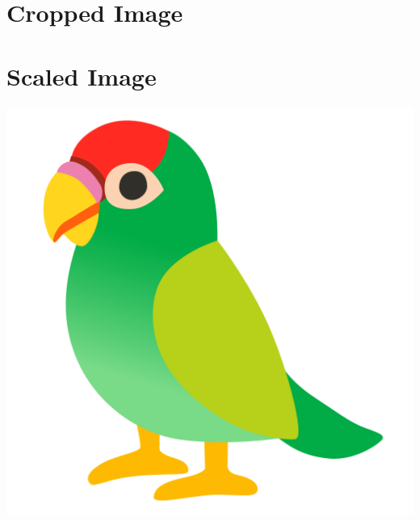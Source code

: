 \documentclass{article}
\begin{document}
    \section{Cropped Image}
    \section{Scaled Image}
    \includegraphics[scale=2]{images/parrot.png}
	
\end{document}
